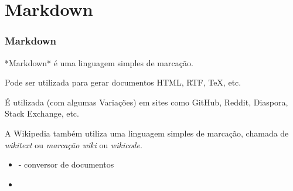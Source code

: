 \section{Markdown}

\begin{frame}
\frametitle{Markdown}
*Markdown* é uma linguagem simples de marcação.

\vspace{3ex}
Pode ser utilizada para gerar documentos HTML, RTF, TeX, etc.

\vspace{3ex}
É utilizada (com algumas Variações) em sites como GitHub, Reddit, Diaspora, Stack Exchange, etc.

\vspace{3ex}
A Wikipedia também utiliza uma linguagem simples de marcação, chamada de \emph{wikitext} ou \emph{marcação wiki} ou \emph{wikicode}.

\framebreak 



\framebreak



\framebreak



\framebreak

\begin{itemize}
\item {} - conversor de documentos
\item {}
\end{itemize}

\end{frame}


